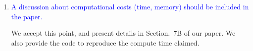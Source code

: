 \documentclass{article}
\begin{document}
\begin{enumerate}
\begin{comment}
  The reason for not reporting RMSE stems from the optimization
  process in Equation~\ref{Eq:simple_TV}.
  
 \begin{equation}
   J_{TV}(\boldsymbol{x}) = \lVert\boldsymbol{\mathcal{R}x}- \boldsymbol{y}\rVert_2^2 + \lambda_{TV}TV(\boldsymbol{x})
   \label{Eq:simple_TV}
 \end{equation}

  This optimization routine 
  transforms the reconstruction values to a different range of
  numerical values.  That is, in our experiments, we observed that for
  a given dataset and a set of projection measurements, the intensity
  span of histograms of reconstructed volumes differ considerably across various
  methods and solvers.  As a result, the RMSE values are not
  particularly useful, and may even be misleading.  We provide the RMSE numbers below to show the
  improvement trend but we believe it does not serve the interest of
  the community to report these in the main paper.

  For the same reason, the standard setting of SSIM in matlab (for
  instance) emphasizes the intensity. We found that even when the
  quality of reconstruction is acceptable visually, the SSIM values
  with the standard values were not acceptable.  We choose
  to focus on preserving the structures on our reconstructions, and
  not rely on the absolute intensity values alone. Hence, we choose
  SSIM with a higher weightage to structure-preservation.

  For the record, sample RMSE values are presented
  here in Table~\ref{table:rmse} that shows
  the superiority of our method at the risk of misleading absolute numbers.

\end{comment}

\item \textcolor{blue}{A discussion about computational costs (time,
  memory) should be included in the paper.}
  
We accept this point, and present details in Section.~7B of our paper.
We also provide the code to reproduce the compute time claimed.

\end{enumerate}

  
\end{document}

